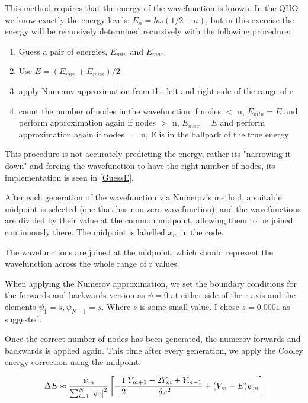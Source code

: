 \documentclass{article}
\begin{document}
    
    This method requires that the energy of the wavefunction is known. In the QHO we know exactly the energy levels; $E_n = \hbar\omega(1/2 + n)$, but in this exercise the energy will be recursively determined recursively with the following procedure:
    \begin{enumerate}
    	\item Guess a pair of energies, $E_{min}$ and $E_{max}$
    	\item Use $E = (E_{min} + E_{max})/2$
    	\item apply Numerov approximation from the left and right side of the range of r
    	\item count the number of nodes in the wavefunction
    	\subitem if nodes $<$ n, $E_{min}=E$ and perform approximation again
    	\subitem if nodes $>$ n, $E_{max}=E$ and perform approximation again
    	\subitem if nodes $=$ n, E is in the ballpark of the true energy
    \end{enumerate}
    
    This procedure is not accurately predicting the energy, rather its "narrowing it down" and forcing the wavefunction to have the right number of nodes, its implementation is seen in \ref{GuessE}.
    
    After each generation of the wavefunction via Numerov's method, a suitable midpoint is selected (one that has non-zero wavefunction), and the wavefunctions are divided by their value at the common midpoint, allowing them to be joined continuously there. The midpoint is labelled $x_m$ in the code. 
    
    The wavefunctions are joined at the midpoint, which should represent the wavefunction across the whole range of r values.
    
    When applying the Numerov approximation, we set the boundary conditions for the forwards and backwards version as $\psi = 0$ at either side of the r-axis and the elements $\psi_1 = s, \psi_{N-1}=s$. Where $s$ is some small value. I chose $s=0.0001$ as suggested.
    
    Once the correct number of nodes has been generated, the numerov forwards and backwards is applied again. This time after every generation, we apply the Cooley energy correction using the midpoint:
    
    \begin{gather}
    	\Delta E \approx \frac{\psi_m}{\sum_{i=1}^{N}\abs{\psi_i}^2} \left[ -\frac{1}{2}\frac{Y_{m+1} - 2Y_{m} + Y_{m-1}}{\delta x^2} + (V_m - E)\psi_m \right]
    \end{gather}
    
\end{document}

